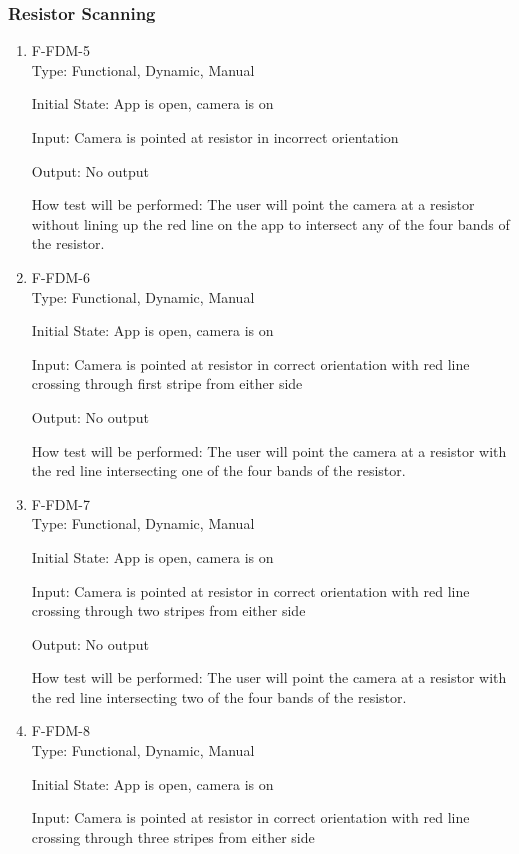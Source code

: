 \documentclass[12pt, titlepage]{article}
\begin{document}
\subsubsection{Resistor Scanning}
\begin{enumerate}
\item{F-FDM-5\\}
Type: Functional, Dynamic, Manual
					
Initial State: 
App is open, camera is on
					
Input: 
Camera is pointed at resistor in incorrect orientation
					
Output: 
No output
					
How test will be performed: 
The user will point the camera at a resistor without lining up the red line on the app to intersect any of the four bands of the resistor.
					
\item{F-FDM-6\\}
Type: Functional, Dynamic, Manual
					
Initial State: 
App is open, camera is on
					
Input: 
Camera is pointed at resistor in correct orientation with red line crossing through first stripe from either side
					
Output: 
No output

How test will be performed: 
The user will point the camera at a resistor with the red line intersecting one of the four bands of the resistor.

\item{F-FDM-7\\}
Type: Functional, Dynamic, Manual
					
Initial State: 
App is open, camera is on
					
Input: 
Camera is pointed at resistor in correct orientation with red line crossing through two stripes from either side
					
Output: 
No output	

How test will be performed: 
The user will point the camera at a resistor with the red line intersecting two of the four bands of the resistor.

\item{F-FDM-8\\}
Type: Functional, Dynamic, Manual
					
Initial State: 
App is open, camera is on
					
Input: 
Camera is pointed at resistor in correct orientation with red line crossing through three stripes from either side
					

\end{enumerate}
\end{document}
